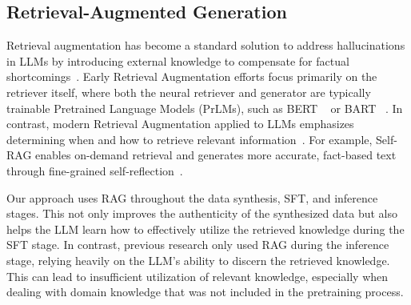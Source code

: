 \subsection{Retrieval-Augmented Generation}
Retrieval augmentation has become a standard solution to address hallucinations in LLMs by introducing external knowledge to compensate for factual shortcomings~\cite{Asai2023SelfRAGLT,ma2023query, Izacard2021UnsupervisedDI, Ram2023InContextRL}.
Early Retrieval Augmentation efforts focus primarily on the retriever itself, where both the neural retriever and generator are typically trainable Pretrained Language Models (PrLMs), such as BERT ~\cite{Devlin2019BERTPO} or BART ~\cite{Lewis2019BARTDS}. In contrast, modern Retrieval Augmentation applied to LLMs emphasizes determining when and how to retrieve relevant information~\cite{fatehkia2024t, Asai2023SelfRAGLT, Xu2024LargeLM}. For example, Self-RAG enables on-demand retrieval and generates more accurate, fact-based text through fine-grained self-reflection~\cite{Asai2023SelfRAGLT}. 

Our approach uses RAG throughout the data synthesis, SFT, and inference stages. This not only improves the authenticity of the synthesized data but also helps the LLM learn how to effectively utilize the retrieved knowledge during the SFT stage. In contrast, previous research only used RAG during the inference stage, relying heavily on the LLM's ability to discern the retrieved knowledge. This can lead to insufficient utilization of relevant knowledge, especially when dealing with domain knowledge that was not included in the pretraining process.